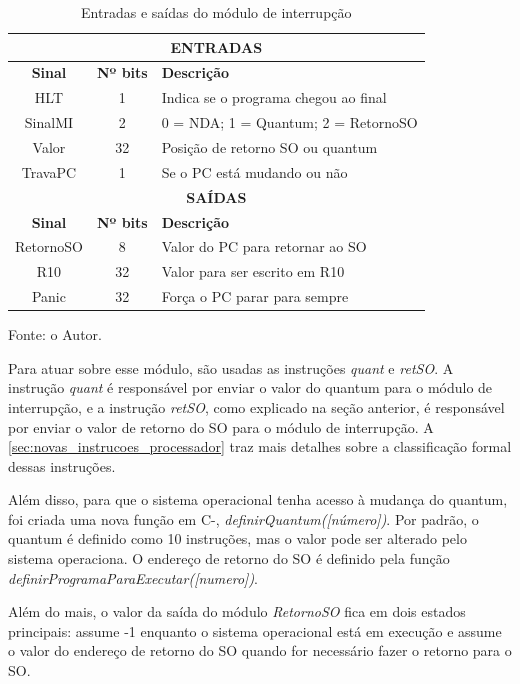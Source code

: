 \documentclass[
	12pt,				%
	oneside,
	a4paper,			%
	english,			%
	french,				%
	spanish,			%
	brazil,				%
	]{abntex2}
\begin{document}
\setlength{\tabcolsep}{10pt} %
\begin{table}[H]
\centering
\caption{Entradas e saídas do módulo de interrupção}
\label{tab:IO_Interrupcao}
\begin{tabular}{|c|c|l|}
\hline
\multicolumn{3}{|c|}{\textbf{ENTRADAS}} \\
\hline
\textbf{Sinal} & \textbf{Nº bits} & \textbf{Descrição} \\
\hline
HLT & 1 & Indica se o programa chegou ao final \\
\hline
SinalMI & 2 & 0 = NDA; 1 = Quantum; 2 = RetornoSO \\ 
\hline
Valor & 32 & Posição de retorno SO ou quantum \\
\hline
TravaPC & 1 & Se o PC está mudando ou não \\
\hline
\multicolumn{3}{|c|}{\textbf{SAÍDAS}} \\
\hline
\textbf{Sinal} & \textbf{Nº bits} & \textbf{Descrição} \\
\hline
RetornoSO & 8 & Valor do PC para retornar ao SO \\
\hline
R10 & 32 & Valor para ser escrito em R10 \\
\hline
Panic & 32 & Força o PC parar para sempre \\
\hline
\end{tabular}
\vspace{-0.5em}
\begin{center}
Fonte: o Autor.
\end{center}
\end{table} 

Para atuar sobre esse módulo, são usadas as instruções \textit{quant} e \textit{retSO}. A instrução \textit{quant} é responsável por enviar o valor do quantum para o módulo de interrupção, e a instrução \textit{retSO}, como explicado na seção anterior, é responsável por enviar o valor de retorno do SO para o módulo de interrupção. A \autoref{sec:novas_instrucoes_processador} traz mais detalhes sobre a classificação formal dessas instruções.

Além disso, para que o sistema operacional tenha acesso à mudança do quantum, foi criada uma nova função em C-, \textit{definirQuantum([número])}. Por padrão, o quantum é definido como 10 instruções, mas o valor pode ser alterado pelo sistema operaciona. O endereço de retorno do SO é definido pela função \textit{definirProgramaParaExecutar([numero])}.

Além do mais, o valor da saída do módulo \textit{RetornoSO} fica em dois estados principais: assume -1 enquanto o sistema operacional está em execução e assume o valor do endereço de retorno do SO quando for necessário fazer o retorno para o SO.
\end{document}
